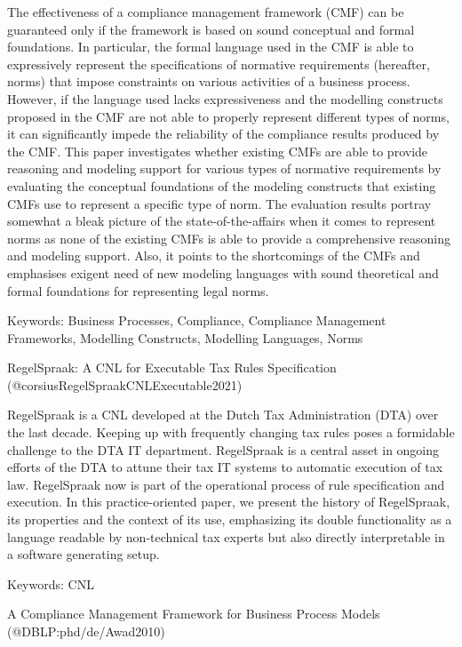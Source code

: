 \documentclass[
  letterpaper,
  DIV=11,
  numbers=noendperiod]{scrartcl}
\begin{document}
The effectiveness of a compliance management framework (CMF) can be
guaranteed only if the framework is based on sound conceptual and formal
foundations. In particular, the formal language used in the CMF is able
to expressively represent the specifications of normative requirements
(hereafter, norms) that impose constraints on various activities of a
business process. However, if the language used lacks expressiveness and
the modelling constructs proposed in the CMF are not able to properly
represent different types of norms, it can significantly impede the
reliability of the compliance results produced by the CMF. This paper
investigates whether existing CMFs are able to provide reasoning and
modeling support for various types of normative requirements by
evaluating the conceptual foundations of the modeling constructs that
existing CMFs use to represent a specific type of norm. The evaluation
results portray somewhat a bleak picture of the state-of-the-affairs
when it comes to represent norms as none of the existing CMFs is able to
provide a comprehensive reasoning and modeling support. Also, it points
to the shortcomings of the CMFs and emphasises exigent need of new
modeling languages with sound theoretical and formal foundations for
representing legal norms.

Keywords: Business Processes, Compliance, Compliance Management
Frameworks, Modelling Constructs, Modelling Languages, Norms

RegelSpraak: A CNL for Executable Tax Rules Specification
(@corsiusRegelSpraakCNLExecutable2021)

RegelSpraak is a CNL developed at the Dutch Tax Administration (DTA)
over the last decade. Keeping up with frequently changing tax rules
poses a formidable challenge to the DTA IT department. RegelSpraak is a
central asset in ongoing efforts of the DTA to attune their tax IT
systems to automatic execution of tax law. RegelSpraak now is part of
the operational process of rule specification and execution. In this
practice-oriented paper, we present the history of RegelSpraak, its
properties and the context of its use, emphasizing its double
functionality as a language readable by non-technical tax experts but
also directly interpretable in a software generating setup.

Keywords: CNL

A Compliance Management Framework for Business Process Models
(@DBLP:phd/de/Awad2010)
\end{document}
